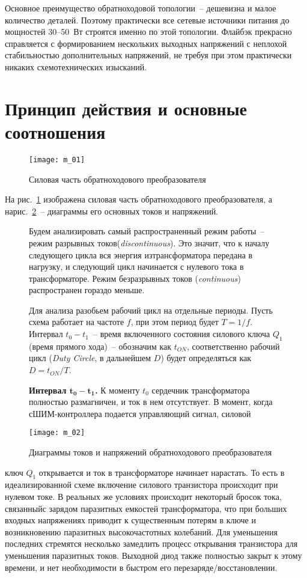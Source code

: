 Основное преимущество обратноходовой топологии~-- дешевизна и малое количество
деталей. Поэтому практически все сетевые источники питания до мощностей
30--50~Вт строятся именно по этой топологии. Флайбэк прекрасно справляется с
формированием нескольких выходных напряжений с неплохой стабильностью
дополнительных напряжений, не требуя при этом практически никаких
схемотехнических изысканий.
\newpage

\section{Принцип действия и основные соотношения}
\begin{figure}[h!]
    \center
    \texttt{[image: m\_01]}
\parbox{.6\textwidth}{\caption{Силовая часть обратноходового
преобразователя}\label{p01}}
\end{figure}
На рис.~\ref{p01} изображена силовая часть обратноходового преобразователя, а нарис.~\ref{p02}~-- диаграммы его основных токов и напряжений.
        
\begin{figure}[h!]
    \begin{minipage}{.5\textwidth}
Будем анализировать самый распространенный режим работы~-- режим разрывных токов(\emph{discontinuous}). Это значит, что к началу следующего цикла вся энергия изтрансформатора передана в нагрузку, и следующий цикл начинается с нулевого тока
в
трансформаторе. Режим безразрывных токов (\emph{continuous}) распространен
гораздо меньше.
        
Для анализа разобьем рабочий цикл на отдельные периоды. Пусть схема работает на
частоте \( f \), при этом период будет \( T = 1/f \). Интервал \( t_0 - t_1
\)~-- время включенного состояния силового ключа \( Q_1 \) (время прямого
хода)~-- обозначим как \( t_{ON} \), соответственно рабочий цикл (\emph{Duty
Circle}, в дальнейшем \( D \)) будет определяться как \( D = t_{ON}/T \).
        
\textbf{Интервал \( \bm{t_0 - t_1} \).} К моменту \( t_0 \) сердечник
трансформатора полностью размагничен, и ток в нем отсутствует. В момент, когда сШИМ-контроллера подается управляющий сигнал, силовой
    \end{minipage} \hfill
    \begin{minipage}{.45\textwidth}
        \texttt{[image: m\_02]}
\parbox{\textwidth}{\caption{Диаграммы токов и напряжений обратноходового
преобразователя}\label{p02}}
    \end{minipage}
\end{figure}
\noindent ключ \( Q_1 \) открывается и ток в трансформаторе начинает нарастать.
То есть в идеализированной схеме включение силового транзистора происходит при
нулевом токе. В реальных же условиях происходит некоторый бросок тока, связанныйс зарядом паразитных емкостей трансформатора, что при больших входных
напряжениях приводит к существенным потерям в ключе и возникновению паразитных
высокочастотных колебаний. Для уменьшения последних стремятся несколько
замедлить процесс открывания транзистора для уменьшения паразитных токов.
Выходной диод также полностью закрыт к этому времени, и нет необходимости в
быстром его перезаряде/восстановлении.

